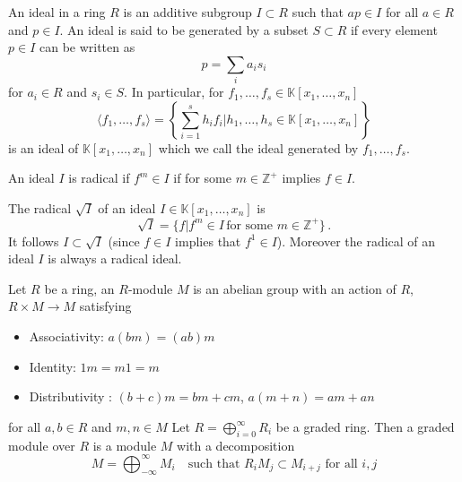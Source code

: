 \documentclass[main.tex]{subfiles}
\begin{document}
\begin{definition}[Ideals]
An ideal in a ring $R$ is an additive subgroup $I\subset R$ such that $ap\in I$ for all $a\in R$ and $p\in I$. An ideal is said to be generated by a subset $S\subset R$ if every element $p\in I$ can be written as
\begin{equation}
p=\sum_{i}a_is_i
\end{equation}
for $a_i\in R$ and $s_i\in S$. In particular, for $f_1,\dots,f_s\in \mathbb{K}[x_1,\dots,x_n]$ 
\begin{equation}
\langle f_1,\dots,f_s\rangle=\left\{\sum_{i=1}^sh_if_i|h_1,\dots,h_s\in \mathbb{K}[x_1,\dots,x_n]\right\}
\end{equation}
is an ideal of $\mathbb{K}[x_1,\dots,x_n]$ which we call the ideal generated by $f_1,\dots,f_s$.
\end{definition}
\begin{definition}\label{def:radideal}
An ideal $I$ is radical if $f^m\in I$ if for some $m\in\mathbb{Z}^+$ implies $f\in I$.
\end{definition}
\begin{definition}\label{def:radofideal}
The radical $\sqrt{I}$ of an ideal $I\in\mathbb{K}[x_1,\dots,x_n]$ is \begin{equation}
\sqrt{I}=\{f|f^m\in I\,\text{for some $m\in\mathbb{Z}^+$} \}\,.
\end{equation}
It follows $I \subset \sqrt{I}$ (since $f \in I$ implies that $f^{1} \in I$). Moreover the radical of an ideal $I$ is always a radical ideal.
\end{definition}
\begin{definition}
Let $R$ be a ring, an $R$-module $M$ is an abelian group with an action of $R$, $R\times M\to M$ satisfying
\begin{itemize}
\item Associativity: $a(bm)=(ab)m$
\item Identity: $1m=m1=m$
\item Distributivity : $(b+c)m=bm+cm$, $a(m+n)=am+an$ 
\end{itemize}
for all $a,b\in R$ and $m,n\in M$
Let $R=\bigoplus_{i=0}^{\infty}R_i$ be a graded ring. Then a graded module over $R$ is a module $M$ with a decomposition
\begin{equation}
M=\bigoplus^{\infty}_{-\infty}M_i\quad \text{such that $R_iM_j\subset M_{i+j}$ for all $i,j$}
\end{equation}
\end{definition}
\end{document}
